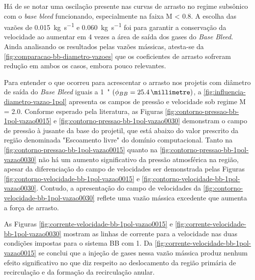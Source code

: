 Há de se notar uma oscilação presente nas curvas de arrasto no regime subsônico com o \textit{base bleed} funcionando, especialmente na faixa M < \num{0,8}. A escolha das vazões de \qty{0,015}{\kilogram\per\second} e \qty{0,060}{\kilogram\per\second} foi para garantir a conservação da velocidade ao aumentar em 4 vezes a área de saída dos gases do \textit{Base Bleed}. Ainda analisando os resultados pelas vazões mássicas, atesta-se da \autoref{fig:comparacao-bb-diametro-vazoes} que os coeficientes de arrasto sofreram redução em ambos os casos, embora pouco relevantes.

Para entender o que ocorreu para acrescentar o arrasto nos projetis com diâmetro de saída do \textit{Base Bleed} iguais a \qty{1}{"} \(\left(\phi_{BB} = \qty{25,4}{\millimetre}\right)\), a \autoref{fig:influencia-diametro-vazao-1pol} apresenta os campos de pressão e velocidade sob regime M = \num{2,0}. Conforme esperado pela literatura, as Figuras \ref{fig:contorno-pressao-bb-1pol-vazao0015} e \ref{fig:contorno-pressao-bb-1pol-vazao0030} demonstram o campo de pressão à jusante da base do projetil, que está abaixo do valor prescrito da região denominada "Escoamento livre"{} do domínio computacional. Tanto na \autoref{fig:contorno-pressao-bb-1pol-vazao0015} quanto na \autoref{fig:contorno-pressao-bb-1pol-vazao0030} não há um aumento significativo da pressão atmosférica na região, apesar da diferenciação do campo de velocidades ser demonstrada pelas Figuras \ref{fig:contorno-velocidade-bb-1pol-vazao0015} e \ref{fig:contorno-velocidade-bb-1pol-vazao0030}. Contudo, a apresentação do campo de velocidades da \autoref{fig:contorno-velocidade-bb-1pol-vazao0030} reflete uma vazão mássica excedente que aumenta a força de arrasto.

As Figuras \ref{fig:corrente-velocidade-bb-1pol-vazao0015} e \ref{fig:corrente-velocidade-bb-1pol-vazao0030} mostram as linhas de corrente para a velocidade nas duas condições impostas para o sistema BB com \qty{1}{\polegada}. Da \autoref{fig:corrente-velocidade-bb-1pol-vazao0015} se conclui que a injeção de gases nessa vazão mássica produz nenhum efeito significativo no que diz respeito ao deslocamento da região primária de recirculação e da formação da recirculação anular.

